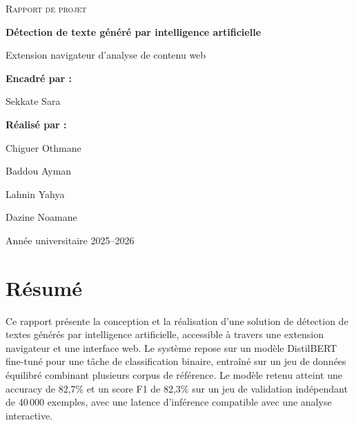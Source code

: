 ﻿\documentclass[12pt, a4paper]{report}
\begin{document}
\begin{titlepage}
  \centering
  \vspace*{2cm}

  {\scshape\Large Rapport de projet\par}
  \vspace{1.5cm}

  {\huge\bfseries Détection de texte généré par intelligence artificielle\par}
  \vspace{2cm}

  {\Large Extension navigateur d'analyse de contenu web\par}
  \vspace{1.8cm}

  \noindent
  \begin{minipage}[t]{0.45\textwidth}
    \raggedright
    {\large \textbf{Encadré par :}\par}
    \vspace{0.3cm}
    {\large Sekkate Sara\par}
  \end{minipage}
  \hfill
  \begin{minipage}[t]{0.45\textwidth}
    \raggedleft
    {\large \textbf{Réalisé par :}\par}
    \vspace{0.3cm}
    {\large Chiguer Othmane\par}
    {\large Baddou Ayman\par}
    {\large Lahnin Yahya\par}
    {\large Dazine Noamane\par}
  \end{minipage}

  \vfill

  {\large Année universitaire 2025--2026\par}
  \vspace{0.5cm}


\end{titlepage}

\chapter*{Résumé}

Ce rapport présente la conception et la réalisation d'une solution de détection
de textes générés par intelligence artificielle, accessible à travers une
extension navigateur et une interface web. Le système repose sur un modèle
DistilBERT fine-tuné pour une tâche de classification binaire, entraîné sur un
jeu de données équilibré combinant plusieurs corpus de référence. Le modèle
retenu atteint une accuracy de 82,7\% et un score F1 de 82,3\% sur un jeu de
validation indépendant de 40\,000 exemples, avec une latence d'inférence
compatible avec une analyse interactive.
\end{document}
